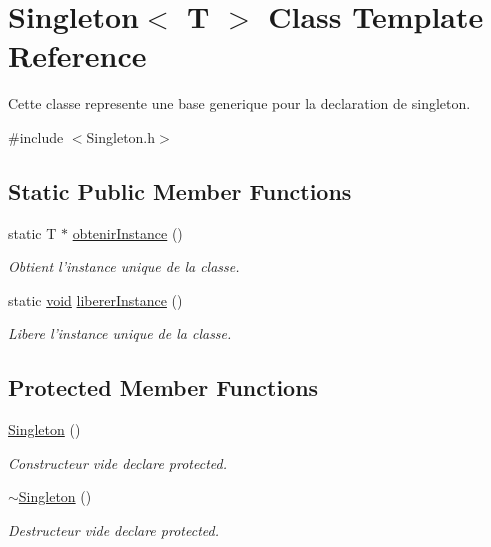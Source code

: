 \hypertarget{class_singleton}{\section{Singleton$<$ T $>$ Class Template Reference}
\label{class_singleton}
}


Cette classe represente une base generique pour la declaration de singleton.  




{\ttfamily \#include $<$Singleton.\-h$>$}

\subsection*{Static Public Member Functions}
\begin{DoxyCompactItemize}
\item 
static T $\ast$ \hyperlink{group__utilitaire_ga349c289d77c484b8b4a180843d968b46}{obtenir\-Instance} ()
\begin{DoxyCompactList}\small\item\em Obtient l'instance unique de la classe. \end{DoxyCompactList}\item 
static \hyperlink{wglew_8h_aeea6e3dfae3acf232096f57d2d57f084}{void} \hyperlink{group__utilitaire_ga2b9ae943a004663d769be3f08ae35a0f}{liberer\-Instance} ()
\begin{DoxyCompactList}\small\item\em Libere l'instance unique de la classe. \end{DoxyCompactList}\end{DoxyCompactItemize}
\subsection*{Protected Member Functions}
\begin{DoxyCompactItemize}
\item 
\hyperlink{class_singleton_a923b995920da9c06590adb170ab2f890}{Singleton} ()
\begin{DoxyCompactList}\small\item\em Constructeur vide declare protected. \end{DoxyCompactList}\item 
\hyperlink{class_singleton_ac6e7af82cba33f561bd64e5e0243e7f8}{$\sim$\-Singleton} ()
\begin{DoxyCompactList}\small\item\em Destructeur vide declare protected. \end{DoxyCompactList}\end{DoxyCompactItemize}


